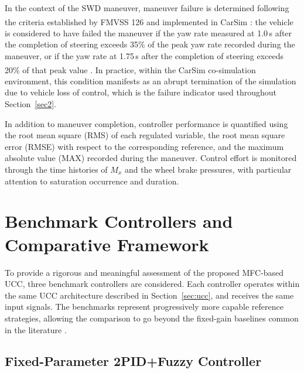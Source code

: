 \documentclass[sn-chicago,iicol]{sn-jnl}
\theoremstyle{thmstyleone}%
\theoremstyle{thmstyletwo}%
\theoremstyle{thmstylethree}%
\begin{document}
In the context of the SWD maneuver, maneuver failure is determined 
following the criteria established by FMVSS 126 and implemented in 
CarSim\textsuperscript{\textregistered} \citep{carsimintro2021}: 
the vehicle is considered to have failed the maneuver if the yaw rate 
measured at 1.0\,s after the completion of steering exceeds 35\% of 
the peak yaw rate recorded during the maneuver, or if the yaw rate 
at 1.75\,s after the completion of steering exceeds 20\% of that peak 
value \citep{MSC2012}. In practice, within the CarSim\textsuperscript{\textregistered}  co-simulation 
environment, this condition manifests as an abrupt termination of the 
simulation due to vehicle loss of control, which is the failure 
indicator used throughout Section~\ref{sec2}.

In addition to maneuver completion, controller performance is quantified 
using the root mean square (RMS) of each regulated variable, the root mean 
square error (RMSE) with respect to the corresponding reference, and the 
maximum absolute value (MAX) recorded during the maneuver. Control effort 
is monitored through the time histories of $M_x$ and the wheel brake pressures, with particular 
attention to saturation occurrence and duration.


\section{Benchmark Controllers and Comparative Framework}\label{sec:bench}

To provide a rigorous and meaningful assessment of the proposed MFC-based 
UCC, three benchmark controllers are considered. Each controller operates 
within the same UCC architecture described in Section~\ref{sec:ucc}, and
receives the same input signals. The 
benchmarks represent progressively more capable reference strategies, 
allowing the comparison to go beyond the fixed-gain baselines common in 
the literature \citep{SanchezMorales2023}.

\subsection{Fixed-Parameter 2PID+Fuzzy Controller}\label{sec:pid}
\end{document}
